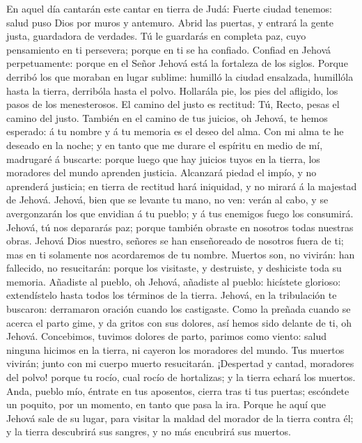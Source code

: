  En aquel día cantarán este cantar en tierra de Judá: Fuerte
ciudad tenemos: salud puso Dios por muros y antemuro.  Abrid
las puertas, y entrará la gente justa, guardadora de verdades.
 Tú le guardarás en completa paz, cuyo pensamiento en ti
persevera; porque en ti se ha confiado.  Confiad en Jehová
perpetuamente: porque en el Señor Jehová está la fortaleza de los
siglos.  Porque derribó los que moraban en lugar sublime:
humilló la ciudad ensalzada, humillóla hasta la tierra, derribóla hasta
el polvo.  Hollarála pie, los pies del afligido, los pasos
de los menesterosos.  El camino del justo es rectitud: Tú,
Recto, pesas el camino del justo.  También en el camino de
tus juicios, oh Jehová, te hemos esperado: á tu nombre y á tu memoria es
el deseo del alma.  Con mi alma te he deseado en la noche; y
en tanto que me durare el espíritu en medio de mí, madrugaré á buscarte:
porque luego que hay juicios tuyos en la tierra, los moradores del mundo
aprenden justicia.  Alcanzará piedad el impío, y no
aprenderá justicia; en tierra de rectitud hará iniquidad, y no mirará á
la majestad de Jehová.  Jehová, bien que se levante tu
mano, no ven: verán al cabo, y se avergonzarán los que envidian á tu
pueblo; y á tus enemigos fuego los consumirá.  Jehová, tú
nos depararás paz; porque también obraste en nosotros todas nuestras
obras.  Jehová Dios nuestro, señores se han enseñoreado de
nosotros fuera de ti; mas en ti solamente nos acordaremos de tu nombre.
 Muertos son, no vivirán: han fallecido, no resucitarán:
porque los visitaste, y destruiste, y deshiciste toda su memoria.
 Añadiste al pueblo, oh Jehová, añadiste al pueblo:
hicístete glorioso: extendístelo hasta todos los términos de la tierra.
 Jehová, en la tribulación te buscaron: derramaron oración
cuando los castigaste.  Como la preñada cuando se acerca el
parto gime, y da gritos con sus dolores, así hemos sido delante de ti,
oh Jehová.  Concebimos, tuvimos dolores de parto, parimos
como viento: salud ninguna hicimos en la tierra, ni cayeron los
moradores del mundo.  Tus muertos vivirán; junto con mi
cuerpo muerto resucitarán. ¡Despertad y cantad, moradores del polvo!
porque tu rocío, cual rocío de hortalizas; y la tierra echará los
muertos.  Anda, pueblo mío, éntrate en tus aposentos,
cierra tras ti tus puertas; escóndete un poquito, por un momento, en
tanto que pasa la ira.  Porque he aquí que Jehová sale de
su lugar, para visitar la maldad del morador de la tierra contra él; y
la tierra descubrirá sus sangres, y no más encubrirá sus muertos.

